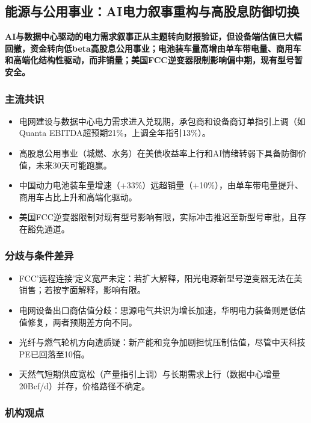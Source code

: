 \documentclass[11pt]{ctexart}
\begin{document}
\subsection{能源与公用事业：AI电力叙事重构与高股息防御切换}
\textbf{AI与数据中心驱动的电力需求叙事正从主题转向财报验证，但设备端估值已大幅回撤，资金转向低beta高股息公用事业；电池装车量高增由单车带电量、商用车和高端化结构性驱动，而非销量；美国FCC逆变器限制影响偏中期，现有型号暂安全。}
\subsubsection*{主流共识}
\begin{itemize}
  \item 电网建设与数据中心电力需求进入兑现期，承包商和设备商订单指引上调（如Quanta EBITDA超预期21\%，上调全年指引13\%）。
  \item 高股息公用事业（城燃、水务）在美债收益率上行和AI情绪转弱下具备防御价值，未来30天可能跑赢。
  \item 中国动力电池装车量增速（+33\%）远超销量（+10\%），由单车带电量提升、商用车占比上升和高端化驱动。
  \item 美国FCC逆变器限制对现有型号影响有限，实际冲击推迟至新型号审批，且存在豁免通道。
\end{itemize}
\subsubsection*{分歧与条件差异}
\begin{itemize}
  \item FCC'远程连接'定义宽严未定：若扩大解释，阳光电源新型号逆变器无法在美销售；若按字面解释，影响有限。
  \item 电网设备出口商估值分歧：思源电气共识为增长加速，华明电力装备则是低估值修复，两者预期差方向不同。
  \item 光纤与燃气轮机方向遭质疑：新产能和竞争加剧担忧压制估值，尽管中天科技PE已回落至10倍。
  \item 天然气短期供应宽松（产量指引上调）与长期需求上行（数据中心增量20Bcf/d）并存，价格路径不确定。
\end{itemize}
\subsubsection*{机构观点}
\end{document}
